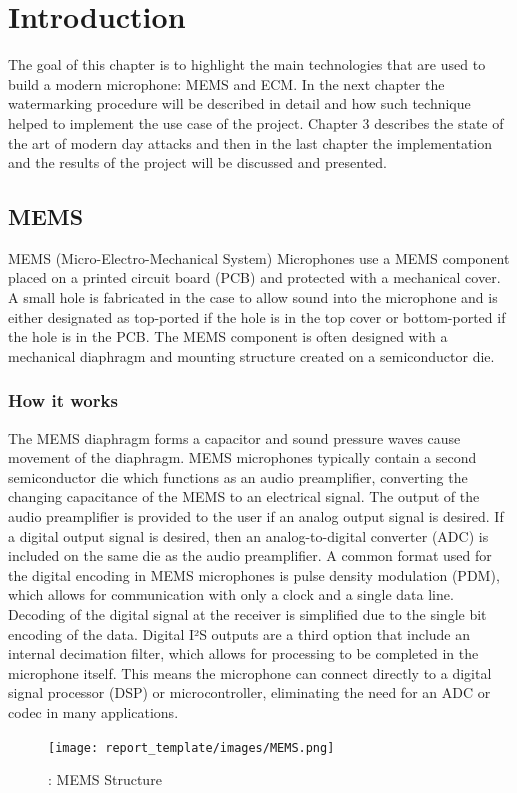 \graphicspath{ {report_template/Images/} }
\chapter{Introduction}
The goal of this chapter is to highlight the main technologies that are used to build a modern microphone: MEMS and ECM. 
\newline
In the next chapter the watermarking procedure will be described in detail and how such technique helped to implement the use case of the project. \newline
Chapter 3 describes the state of the art of modern day attacks and then in the last chapter the implementation and the results of the project will be discussed and presented.
\section{MEMS}
MEMS (Micro-Electro-Mechanical System) Microphones use a MEMS component placed on a printed circuit board (PCB) and protected with a mechanical cover. A small hole is fabricated in the case to allow sound into the microphone and is either designated as top-ported if the hole is in the top cover or bottom-ported if the hole is in the PCB. The MEMS component is often designed with a mechanical diaphragm and mounting structure created on a semiconductor die.
\subsection{How it works}
The MEMS diaphragm forms a capacitor and sound pressure waves cause movement of the diaphragm. MEMS microphones typically contain a second semiconductor die which functions as an audio preamplifier, converting the changing capacitance of the MEMS to an electrical signal. The output of the audio preamplifier is provided to the user if an analog output signal is desired. If a digital output signal is desired, then an analog-to-digital converter (ADC) is included on the same die as the audio preamplifier. A common format used for the digital encoding in MEMS microphones is pulse density modulation (PDM), which allows for communication with only a clock and a single data line. Decoding of the digital signal at the receiver is simplified due to the single bit encoding of the data. Digital I²S outputs are a third option that include an internal decimation filter, which allows for processing to be completed in the microphone itself. This means the microphone can connect directly to a digital signal processor (DSP) or microcontroller, eliminating the need for an ADC or codec in many applications.
\begin{figure}[H]
    \centering
    \texttt{[image: report\_template/images/MEMS.png]}
    \caption{: MEMS Structure}
    \label{fig:MEMS}
\end{figure}

